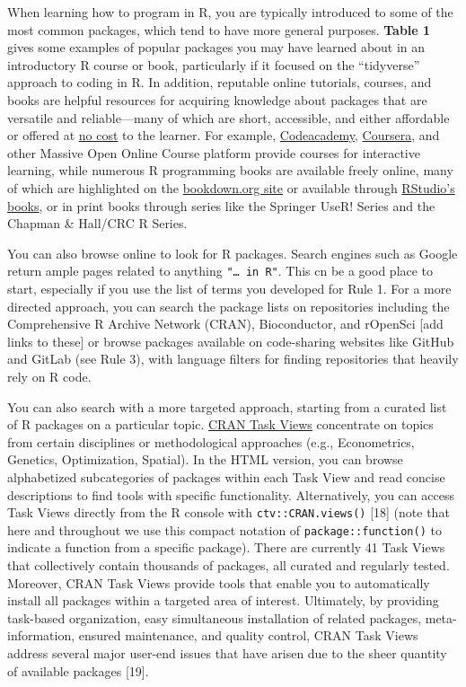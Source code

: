 \documentclass[10pt,letterpaper]{article}
\begin{document}
When learning how to program in R, you are typically introduced to some
of the most common packages, which tend to have more general purposes.
\textbf{Table 1} gives some examples of popular packages you may have
learned about in an introductory R course or book, particularly if it
focused on the ``tidyverse'' approach to coding in R. In addition,
reputable online tutorials, courses, and books are helpful resources for
acquiring knowledge about packages that are versatile and
reliable---many of which are short, accessible, and either affordable or
offered at \href{https://committedtotape.shinyapps.io/freeR/}{no cost}
to the learner. For example,
\href{https://www.codecademy.com/learn/learn-r}{Codeacademy},
\href{https://www.coursera.org/learn/r-programming}{Coursera}, and other
Massive Open Online Course platform provide courses for interactive
learning, while numerous R programming books are available freely
online, many of which are highlighted on the
\href{https://bookdown.org/}{bookdown.org site} or available through
\href{https://rstudio.com/resources/books/}{RStudio's books}, or in
print books through series like the Springer UseR! Series and the
Chapman \& Hall/CRC R Series.

You can also browse online to look for R packages. Search engines such
as Google return ample pages related to anything
\texttt{"\ldots{}\ in\ R"}. This cn be a good place to start, especially
if you use the list of terms you developed for Rule 1. For a more
directed approach, you can search the package lists on repositories
including the Comprehensive R Archive Network (CRAN), Bioconductor, and
rOpenSci {[}add links to these{]} or browse packages available on
code-sharing websites like GitHub and GitLab (see Rule 3), with language
filters for finding repositories that heavily rely on R code.

You can also search with a more targeted approach, starting from a
curated list of R packages on a particular topic.
\href{https://cran.r-project.org/web/views/}{CRAN Task Views}
concentrate on topics from certain disciplines or methodological
approaches (e.g., Econometrics, Genetics, Optimization, Spatial). In the
HTML version, you can browse alphabetized subcategories of packages
within each Task View and read concise descriptions to find tools with
specific functionality. Alternatively, you can access Task Views
directly from the R console with \texttt{ctv::CRAN.views()} {[}18{]}
(note that here and throughout we use this compact notation of
\texttt{package::function()} to indicate a function from a specific
package). There are currently 41 Task Views that collectively contain
thousands of packages, all curated and regularly tested. Moreover, CRAN
Task Views provide tools that enable you to automatically install all
packages within a targeted area of interest. Ultimately, by providing
task-based organization, easy simultaneous installation of related
packages, meta-information, ensured maintenance, and quality control,
CRAN Task Views address several major user-end issues that have arisen
due to the sheer quantity of available packages {[}19{]}.
\end{document}
